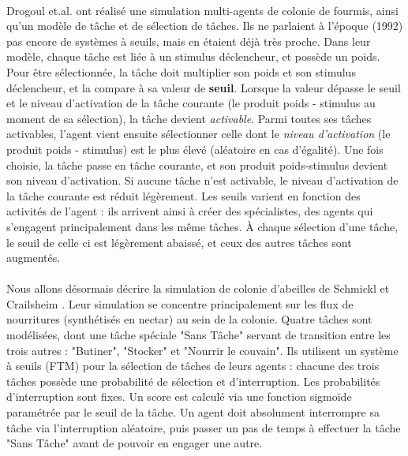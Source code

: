         \paragraph{}
        Drogoul et.al. \cite{drogoul_multi-agent_1992} ont réalisé une simulation multi-agents de colonie de fourmis, ainsi qu'un modèle de tâche et de sélection de tâches. Ils ne parlaient à l'époque (1992) pas encore de systèmes à seuils, mais en étaient déjà très proche. Dans leur modèle, chaque tâche est liée à un stimulus déclencheur, et possède un poids. Pour être sélectionnée, la tâche doit multiplier son poids et son stimulus déclencheur, et la compare à sa valeur de \textbf{seuil}. Lorsque la valeur dépasse le seuil et le niveau d'activation de la tâche courante (le produit poids - stimulus au moment de sa sélection), la tâche devient \textit{activable}. Parmi toutes ses tâches activables, l'agent vient ensuite sélectionner celle dont le \textit{niveau d'activation} (le produit poids - stimulus) est le plus élevé (aléatoire en cas d'égalité). Une fois choisie, la tâche passe en tâche courante, et son produit poids-stimulus devient son niveau d'activation. Si aucune tâche n'est activable, le niveau d'activation de la tâche courante est réduit légèrement. Les seuils varient en fonction des activités de l'agent : ils arrivent ainsi à créer des spécialistes, des agents qui s'engagent principalement dans les même tâches. À chaque sélection d'une tâche, le seuil de celle ci est légèrement abaissé, et ceux des autres tâches sont augmentés.
        
        \paragraph{}
        Nous allons désormais décrire la simulation de colonie d'abeilles de Schmickl et Crailsheim \cite{schmickl_analysing_2008}. Leur simulation se concentre principalement sur les flux de nourritures (synthétisés en nectar) au sein de la colonie. Quatre tâches sont modélisées, dont une tâche spéciale "Sans Tâche" servant de transition entre les trois autres : "Butiner", "Stocker" et "Nourrir le couvain". Ils utilisent un système à seuils (FTM) pour la sélection de tâches de leurs agents : chacune des trois tâches possède une probabilité de sélection et d'interruption. Les probabilités d'interruption sont fixes. Un score est calculé via une fonction sigmoïde paramétrée par le seuil de la tâche. Un agent doit absolument interrompre sa tâche via l'interruption aléatoire, puis passer un pas de temps à effectuer la tâche "Sans Tâche" avant de pouvoir en engager une autre. 
        
